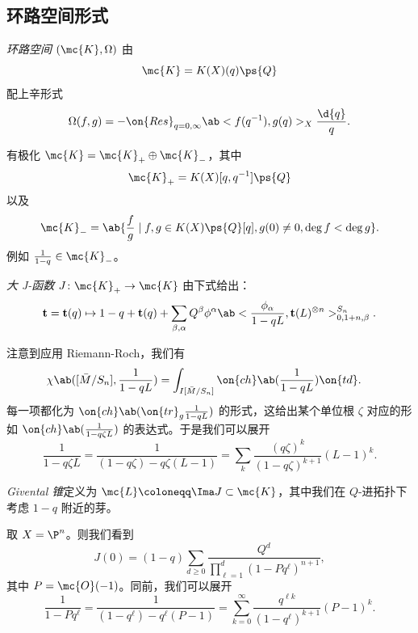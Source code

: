 \subsection{环路空间形式}%
\label{sub:Loop space formalism}

\begin{defn}
    \textit{环路空间} \((\mc{K}, \Omega)\) 由
    \[ \mc{K} = K(X)(q) \ps{Q}\]
    配上辛形式
    \[ \Omega(f, g) = - \on{Res}_{q = 0, \infty} \ab<f(q^{-1}), g(q)>_X \frac{\d{q}}{q}. \]
\end{defn}

\begin{rmk}
    有极化 \(\mc{K} = \mc{K}_+ \oplus \mc{K}_-\)，其中
    \[ \mc{K}_+ = K(X)[q, q^{-1}]\ps{Q} \]
    以及
    \[ \mc{K}_- = \ab\{ \frac{f}{g} \mid f, g \in K(X)\ps{Q}[q], g(0) \neq 0, \deg f < \deg g\}. \]
    例如 \(\frac{1}{1-q} \in \mc{K}_-\)。
\end{rmk}

\begin{defn}
    \textit{大 J-函数} \(J \colon \mc{K}_+ \to \mc{K}\) 由下式给出：
    \[ \mathbf{t} = \mathbf{t}(q) \mapsto 1 - q + \mathbf{t}(q) + \sum_{\beta, \alpha} Q^{\beta} \phi^{\alpha} \ab< \frac{\phi_{\alpha}}{1-qL}, \mathbf{t}(L)^{\otimes n}>_{0, 1+n, \beta}^{S_n}. \]
\end{defn}

\begin{rmk}
    注意到应用 Riemann-Roch，我们有
    \begin{align*}
        \chi\ab([\bar{M}/S_n], \frac{1}{1-qL}) &= \int_{I[\bar{M}/S_n]} \on{ch}\ab(\frac{1}{1-qL}) \on{td}.
    \end{align*}
    每一项都化为 \(\on{ch}\ab(\on{tr}_g \frac{1}{1-qL})\) 的形式，这给出某个单位根 \(\zeta\) 对应的形如 \(\on{ch}\ab(\frac{1}{1-q\zeta L})\) 的表达式。于是我们可以展开
    \[ \frac{1}{1-q\zeta L} = \frac{1}{(1-q \zeta) - q\zeta (L-1)} = \sum_k \frac{(q\zeta)^k}{(1-q\zeta)^{k+1}}(L-1)^k. \]
\end{rmk}

\begin{defn}
    \textit{Givental 锥}定义为 \(\mc{L} \coloneqq \Ima J \subset \mc{K}\)，其中我们在 \(Q\)-进拓扑下考虑 \(1-q\) 附近的芽。
\end{defn}

\begin{exm}
    取 \(X = \P^n\)。则我们看到
    \[ J(0) = (1-q) \sum_{d \geq 0} \frac{Q^d}{\prod_{\ell=1}^d (1-Pq^{\ell})^{n+1}}, \]
    其中 \(P = \mc{O}(-1)\)。同前，我们可以展开
    \[ \frac{1}{1-P q^{\ell}} = \frac{1}{(1-q^{\ell}) - q^{\ell}(P-1)} = \sum_{k=0}^{\infty} \frac{q^{\ell k}}{(1-q^{\ell})^{k+1}}(P-1)^k. \]
\end{exm}

